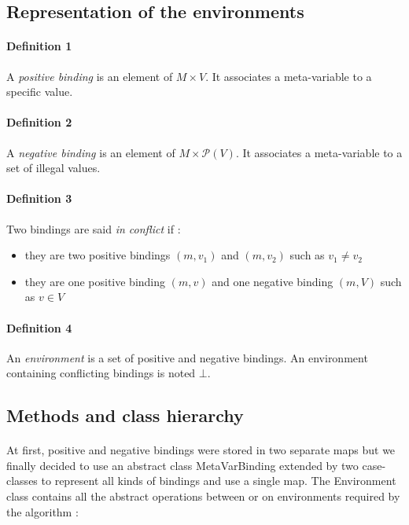 \documentclass{report}
\begin{document}
\subsection{Representation of the environments}

\paragraph{Definition 1}
A \textit{positive binding} is an element of $M \times V$. It associates a meta-variable to a specific value.

\paragraph{Definition 2}
A \textit{negative binding} is an element of $M \times \mathscr{P}(V)$. It associates a meta-variable to a set of illegal values.

\paragraph{Definition 3}
Two bindings are said \textit{in conflict} if :

\vspace{1.5mm}
\begin{itemize}
\item they are two positive bindings $(m,v_1)$ and $(m,v_2)$ such as $v_1 \neq v_2$\vspace{1mm}
\item they are one positive binding $(m,v)$ and one negative binding $(m,V)$ such as
$v \in V$\vspace{1mm}
\end{itemize}

\paragraph{Definition 4}
An \textit{environment} is a set of positive and negative bindings.  An environment 
containing conflicting bindings is noted $\bot$.

\subsection* {Methods and class hierarchy}
\paragraph{}
\hspace{4mm}At first, positive and negative bindings were stored in two separate maps but we finally decided 
to use an abstract class MetaVarBinding extended by two case-classes to represent all kinds of bindings and use a single map.
The Environment class contains all the abstract operations between or on environments required by the algorithm :
\end{document}
